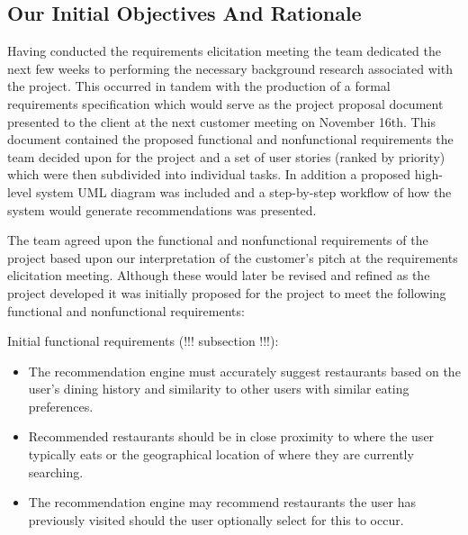 \documentclass{l3proj}
\begin{document}
\subsection{Our Initial Objectives And Rationale}
\label{ourinitobjectives}






Having conducted the requirements elicitation meeting the team dedicated the next few weeks to performing the necessary background research associated with the project. This occurred in tandem with the production of a formal requirements specification which would serve as the project proposal document presented to the client at the next customer meeting on November 16th. This document contained the proposed functional and nonfunctional requirements the team decided upon for the project and a set of user stories (ranked by priority) which were then subdivided into individual tasks. In addition a proposed high-level system UML diagram was included and a step-by-step workflow of how the system would generate recommendations was presented. 

The team agreed upon the functional and nonfunctional requirements of the project based upon our interpretation of the customer’s pitch at the requirements elicitation meeting. Although these would later be revised and refined as the project developed it was initially proposed for the project to meet the following functional and nonfunctional requirements:

Initial functional requirements (!!! subsection !!!):
\begin{itemize}
\item The recommendation engine must accurately suggest restaurants based on the user’s dining history and similarity to other users with similar eating preferences.
\item Recommended restaurants should be in close proximity to where the user typically eats or the geographical location of where they are currently searching.
\item The recommendation engine may recommend restaurants the user has previously visited should the user optionally select for this to occur.
\end{itemize}
\end{document}
